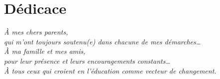 \chapter*{Dédicace}
\thispagestyle{plain}

\vspace*{3cm}
\begin{flushright}
  \itshape
  À mes chers parents,\\
  qui m'ont toujours soutenu(e) dans chacune de mes démarches\ldots\\[14pt]
  À ma famille et mes amis,\\
  pour leur présence et leurs encouragements constants\ldots\\[14pt]
  À tous ceux qui croient en l'éducation comme vecteur de changement.
\end{flushright}
\newpage
